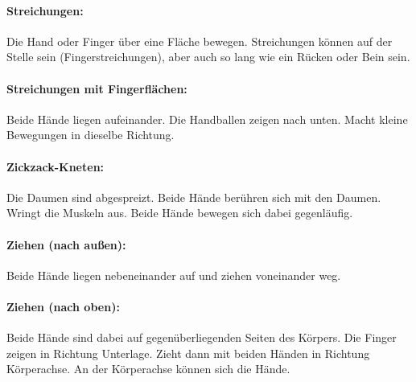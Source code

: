\paragraph{Streichungen:} Die Hand oder Finger über eine Fläche bewegen. Streichungen können auf der Stelle sein (Fingerstreichungen), aber auch so lang wie ein Rücken oder Bein sein.

\paragraph{Streichungen mit Fingerflächen:} Beide Hände liegen aufeinander. Die Handballen zeigen nach unten. Macht kleine Bewegungen in dieselbe Richtung.

\paragraph{Zickzack-Kneten:} Die Daumen sind abgespreizt. Beide Hände berühren sich mit den Daumen. Wringt die Muskeln aus. Beide Hände bewegen sich dabei gegenläufig.

\paragraph{Ziehen (nach außen):} Beide Hände liegen nebeneinander auf und ziehen voneinander weg.

\paragraph{Ziehen (nach oben):} Beide Hände sind dabei auf gegenüberliegenden Seiten des Körpers. Die Finger zeigen in Richtung Unterlage. Zieht dann mit beiden Händen in Richtung Körperachse. An der Körperachse können sich die Hände.

